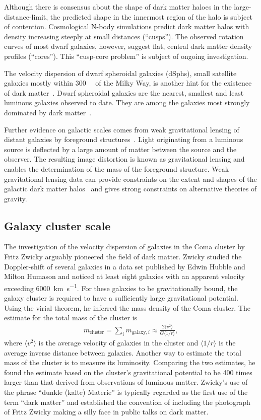 Although there is consensus about the shape of dark matter haloes in the large-distance-limit, the predicted shape in the innermost region of the halo is subject of contention. Cosmological N-body simulations predict dark matter halos with density increasing steeply at small distances (``cusps''). The observed rotation curves of most dwarf galaxies, however, suggest flat, central dark matter density profiles (``cores''). This ``cusp-core problem'' is subject of ongoing investigation.

The velocity dispersion of dwarf spheroidal galaxies (dSphs), small satellite galaxies mostly within \SI{300}{\kilo\parsec} of the Milky Way, is another hint for the existence of dark matter~\cite{Strigari2018}. Dwarf spheroidal galaxies are the nearest, smallest and least luminous galaxies observed to date. They are among the galaxies most strongly dominated by dark matter~\cite{Walker2013}.

Further evidence on galactic scales comes from weak gravitational lensing of distant galaxies by foreground structures~\cite{Bartelmann2016}. Light originating from a luminous source is deflected by a large amount of matter between the source and the observer. The resulting image distortion is known as gravitational lensing and enables the determination of the mass of the foreground structure. Weak gravitational lensing data can provide constraints on the extent and shapes of the galactic dark matter halos~\cite{Hoekstra2002} and gives strong constraints on alternative theories of gravity.


\subsection{Galaxy cluster scale}
\label{sec:dm:evidence:cluster}
The investigation of the velocity dispersion of galaxies in the Coma cluster by Fritz Zwicky arguably pioneered the field of dark matter. Zwicky studied the Doppler-shift of several galaxies in a data set published by Edwin Hubble and Milton Humason and noticed at least eight galaxies with an apparent velocity exceeding \SI{6000}{\kilo\meter\per\second}. For these galaxies to be gravitationally bound, the galaxy cluster is required to have a sufficiently large gravitational potential. Using the virial theorem, he inferred the mass density of the Coma cluster. The estimate for the total mass of the cluster is
\begin{align}
    m_{\text{cluster}} = \sum_{i} m_{\text{galaxy}, i} \approx \frac{2 \langle v^2 \rangle}{G \langle 1 / r\rangle},
\end{align}
where \(\langle v^2 \rangle\) is the average velocity of galaxies in the cluster and \(\langle 1 / r \rangle\) is the average inverse distance between galaxies. Another way to estimate the total mass of the cluster is to measure its luminosity. Comparing the two estimates, he found the estimate based on the cluster's gravitational potential to be 400 times larger than that derived from observations of luminous matter.
Zwicky's use of the phrase ``dunkle (kalte) Materie'' is typically regarded as the first use of the term ``dark matter'' and established the convention of including the photograph of Fritz Zwicky making a silly face in public talks on dark matter.


